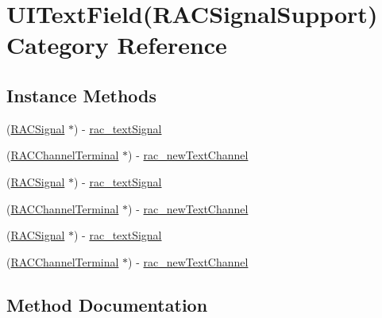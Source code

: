 \hypertarget{category_u_i_text_field_07_r_a_c_signal_support_08}{}\section{U\+I\+Text\+Field(R\+A\+C\+Signal\+Support) Category Reference}
\label{category_u_i_text_field_07_r_a_c_signal_support_08}
\subsection*{Instance Methods}
\begin{DoxyCompactItemize}
\item 
(\mbox{\hyperlink{interface_r_a_c_signal}{R\+A\+C\+Signal}} $\ast$) -\/ \mbox{\hyperlink{category_u_i_text_field_07_r_a_c_signal_support_08_a08ba059db9a0942f9ff9efd80cde7edd}{rac\+\_\+text\+Signal}}
\item 
(\mbox{\hyperlink{interface_r_a_c_channel_terminal}{R\+A\+C\+Channel\+Terminal}} $\ast$) -\/ \mbox{\hyperlink{category_u_i_text_field_07_r_a_c_signal_support_08_a531a00a7a1fb4ffec0a479844e5d1ded}{rac\+\_\+new\+Text\+Channel}}
\item 
(\mbox{\hyperlink{interface_r_a_c_signal}{R\+A\+C\+Signal}} $\ast$) -\/ \mbox{\hyperlink{category_u_i_text_field_07_r_a_c_signal_support_08_a08ba059db9a0942f9ff9efd80cde7edd}{rac\+\_\+text\+Signal}}
\item 
(\mbox{\hyperlink{interface_r_a_c_channel_terminal}{R\+A\+C\+Channel\+Terminal}} $\ast$) -\/ \mbox{\hyperlink{category_u_i_text_field_07_r_a_c_signal_support_08_a531a00a7a1fb4ffec0a479844e5d1ded}{rac\+\_\+new\+Text\+Channel}}
\item 
(\mbox{\hyperlink{interface_r_a_c_signal}{R\+A\+C\+Signal}} $\ast$) -\/ \mbox{\hyperlink{category_u_i_text_field_07_r_a_c_signal_support_08_a08ba059db9a0942f9ff9efd80cde7edd}{rac\+\_\+text\+Signal}}
\item 
(\mbox{\hyperlink{interface_r_a_c_channel_terminal}{R\+A\+C\+Channel\+Terminal}} $\ast$) -\/ \mbox{\hyperlink{category_u_i_text_field_07_r_a_c_signal_support_08_a531a00a7a1fb4ffec0a479844e5d1ded}{rac\+\_\+new\+Text\+Channel}}
\end{DoxyCompactItemize}


\subsection{Method Documentation}
\mbox{\label{category_u_i_text_field_07_r_a_c_signal_support_08_a531a00a7a1fb4ffec0a479844e5d1ded}} 
